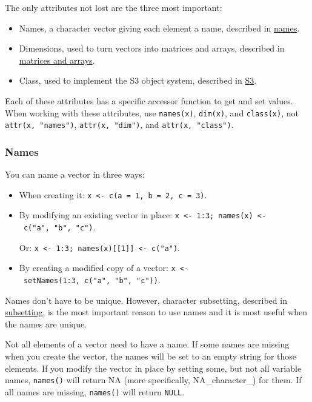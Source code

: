 The only attributes not lost are the three most important:

\begin{itemize}
\item
  Names, a character vector giving each element a name, described in
  \protect\hyperlink{vector-names}{names}.
\item
  Dimensions, used to turn vectors into matrices and arrays, described
  in \protect\hyperlink{matrices-and-arrays}{matrices and arrays}.
\item
  Class, used to implement the S3 object system, described in
  \protect\hyperlink{s3}{S3}.
\end{itemize}

Each of these attributes has a specific accessor function to get and set
values. When working with these attributes, use \texttt{names(x)},
\texttt{dim(x)}, and \texttt{class(x)}, not \texttt{attr(x,\ "names")},
\texttt{attr(x,\ "dim")}, and \texttt{attr(x,\ "class")}.

\hypertarget{vector-names}{%
\subsubsection{Names}\label{vector-names}}

You can name a vector in three ways: 

\begin{itemize}
\item
  When creating it:
  \texttt{x\ \textless{}-\ c(a\ =\ 1,\ b\ =\ 2,\ c\ =\ 3)}.
\item
  By modifying an existing vector in place:
  \texttt{x\ \textless{}-\ 1:3;\ names(x)\ \textless{}-\ c("a",\ "b",\ "c")}.

  Or:
  \texttt{x\ \textless{}-\ 1:3;\ names(x){[}{[}1{]}{]}\ \textless{}-\ c("a")}.
\item
  By creating a modified copy of a vector:
  \texttt{x\ \textless{}-\ setNames(1:3,\ c("a",\ "b",\ "c"))}.
\end{itemize}

Names don't have to be unique. However, character subsetting, described
in \protect\hyperlink{lookup-tables}{subsetting}, is the most important
reason to use names and it is most useful when the names are unique.

Not all elements of a vector need to have a name. If some names are
missing when you create the vector, the names will be set to an empty
string for those elements. If you modify the vector in place by setting
some, but not all variable names, \texttt{names()} will return NA (more
specifically, NA\_character\_) for them. If all names are missing,
\texttt{names()} will return \texttt{NULL}.

